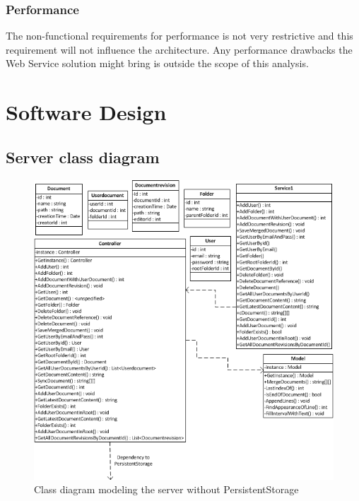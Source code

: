 \documentclass[a4paper,11pt,report]{report}
\begin{document}
\subsubsection{Performance}
The non-functional requirements for performance is not very restrictive and this requirement will not influence the architecture. Any performance drawbacks the Web Service solution might bring is outside the scope of this analysis.


\section{Software Design}
\subsection{Server class diagram}
\begin{figure}[H]
  \centering
\includegraphics[]{./classdiagramserver1}
\caption{Class diagram modeling the server without PersistentStorage}
\end{figure}
\end{document}
